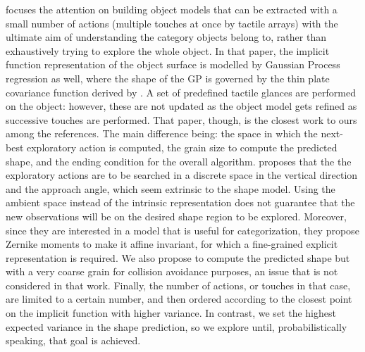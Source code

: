 \citet{Bjorkman2013Enhancing} focuses the attention on building object models that can be extracted with a small number of actions (multiple touches at once by tactile arrays) with the ultimate aim of understanding the category objects belong to, rather than exhaustively trying to explore the whole object. In that paper, the implicit function representation of the object surface is modelled by Gaussian Process regression as well, where the shape of the GP is governed by the thin plate covariance function derived by \citet{Williams2007Gaussian}. A set of predefined tactile glances are performed on the object: however, these are not updated as the object model gets refined as successive touches are performed. That paper, though, is the closest work to ours among the references. The main difference being: the space in which the next-best exploratory action is computed, the grain size to compute the predicted shape, and the ending condition for the overall algorithm.
\citet{Bjorkman2013Enhancing}
proposes that the the exploratory actions are to be searched in a discrete space in the vertical direction and the approach angle, which seem extrinsic to the shape model. Using the ambient space instead of the intrinsic representation does not guarantee that the new observations will be on the desired shape region to be explored. Moreover, since they are interested in a model that is useful for categorization, they propose Zernike moments to make it affine invariant, for which a fine-grained explicit representation is required. We also propose to compute the predicted shape but with a very coarse grain for collision avoidance purposes, an issue that is not considered in that work. Finally, the number of actions, or touches in that case, are limited to a certain number, and then ordered according to the closest point on the implicit function with higher variance. In contrast, we set the highest expected variance in the shape prediction, so we explore until, probabilistically speaking, that goal is achieved.
